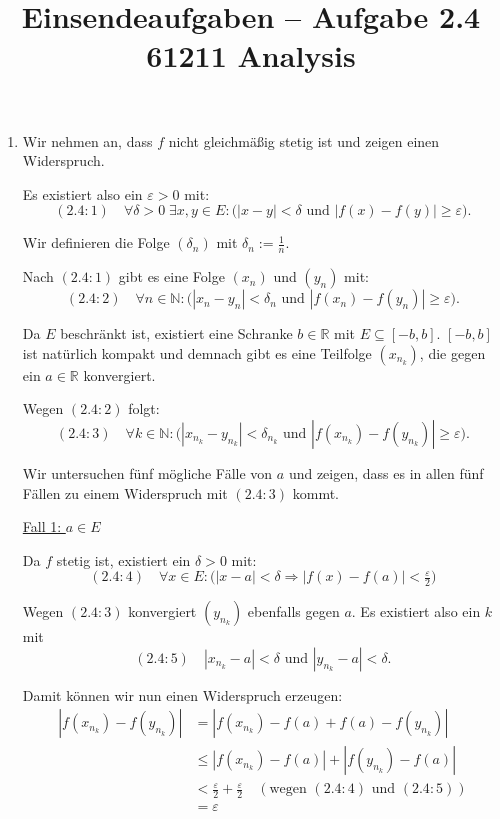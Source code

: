 \documentclass[a4paper,12pt]{article}
\title{Einsendeaufgaben -- Aufgabe 2.4\\[0.5em]
\large 61211 Analysis}
\author{}
\date{}
\begin{document}
\maketitle

\begin{enumerate}[label=\alph*)]
    \item

          Wir nehmen an, dass $f$ nicht gleichmäßig stetig ist und zeigen einen Widerspruch.

          Es existiert also ein $\varepsilon > 0$ mit:
          \[
              (2.4{:}1) \quad \forall \delta > 0 \; \exists x, y \in E : \bigl( |x - y| < \delta \text{ und } |f(x) - f(y)| \geq \varepsilon \bigr).
          \]

          Wir definieren die Folge $(\delta_n)$ mit $\delta_n := \tfrac{1}{n}$.

          Nach $(2.4{:}1)$ gibt es eine Folge $(x_n)$ und $(y_n)$ mit:
          \[
              (2.4{:}2) \quad \forall n \in \mathbb{N} : \bigl( |x_n - y_n| < \delta_n \text{ und } |f(x_n) - f(y_n)| \geq \varepsilon \bigr).
          \]

          Da $E$ beschränkt ist, existiert eine Schranke $b \in \mathbb{R}$ mit $E \subseteq [-b, b]$. $[-b, b]$ ist natürlich kompakt und demnach gibt es eine Teilfolge $(x_{n_k})$, die gegen ein $a \in \mathbb{R}$ konvergiert.

          Wegen $(2.4{:}2)$ folgt:
          \[
              (2.4{:}3) \quad \forall k \in \mathbb{N} : \bigl( |x_{n_k} - y_{n_k}| < \delta_{n_k} \text{ und } |f(x_{n_k}) - f(y_{n_k})| \geq \varepsilon \bigr).
          \]

          Wir untersuchen fünf mögliche Fälle von $a$ und zeigen, dass es in allen fünf Fällen zu einem Widerspruch mit $(2.4{:}3)$ kommt.

          \bigskip

          \underline{Fall 1: $a \in E$}

          Da $f$ stetig ist, existiert ein $\delta > 0$ mit:
          \[
              (2.4{:}4) \quad \forall x \in E : \bigl( |x - a| < \delta \Rightarrow |f(x) - f(a)| < \tfrac{\varepsilon}{2} \bigr)
          \]

          Wegen $(2.4{:}3)$ konvergiert $(y_{n_k})$ ebenfalls gegen $a$. Es existiert also ein $k$ mit
          \[
              (2.4{:}5) \quad |x_{n_k} - a| < \delta \text{ und } |y_{n_k} - a| < \delta.
          \]

          Damit können wir nun einen Widerspruch erzeugen:
          \begin{align*}
              |f(x_{n_k}) - f(y_{n_k})|
               & = |f(x_{n_k}) - f(a) + f(a) - f(y_{n_k})|                                                               \\
               & \leq |f(x_{n_k}) - f(a)| + |f(y_{n_k}) - f(a)|                                                           \\
               & < \tfrac{\varepsilon}{2} + \tfrac{\varepsilon}{2} \quad (\text{wegen } (2.4{:}4) \text{ und } (2.4{:}5)) \\
               & = \varepsilon
          \end{align*}


\end{enumerate}
\end{document}
